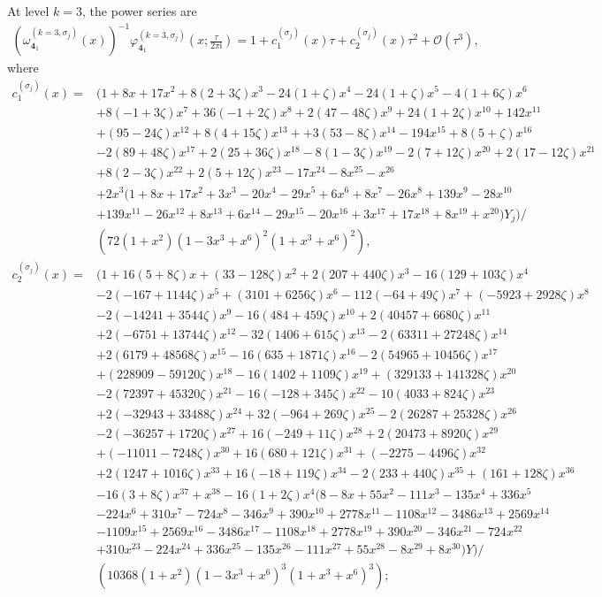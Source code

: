 \documentclass[a4paper,11pt]{article}	%
\def\md{\mathbf}
\def\cO{\mathcal{O}}
\newcommand{\ri}{{\mathsf{i}}}
\newcommand{\nn}{\nonumber \\}
\newcommand{\s}{\sigma}
\newcommand{\knot}[1]{\md{#1}}
\begin{document}
At level $k=3$, the power series are
\begin{align}
  (\omega_{\knot{4}_1}^{(k=3,\s_j)}(x))^{-1}
  \varphi_{\knot{4}_1}^{(k=3,\s_j)}(x;\frac{\tau}{2\pi\ri}) = 1 +
  c^{(\s_j)}_1(x) \tau + c^{(\s_j)}_2(x)\tau^2+ \cO(\tau^3),
\end{align}
where
\begin{align}
  c_1^{(\s_j)}(x) =
  & (1 +8 x +17 x^2 +8(2+3\zeta) x^3-24(1+\zeta) x^4
    -24(1+\zeta) x^5
    -4(1+6\zeta) x^6\nn
  &+ 8(-1+3\zeta) x^7
    + 36(-1+2\zeta) x^8
    + 2(47-48\zeta) x^9
    + 24(1+2\zeta) x^{10}
    +142 x^{11} \nn
  &+ (95-24\zeta) x^{12}
    + 8(4+15\zeta) x^{13}
    + +3(53-8\zeta) x^{14}
    - 194 x^{15}
    + 8 (5+\zeta) x^{16}\nn
  &- 2(89+48\zeta) x^{17}
    + 2(25+36\zeta) x^{18}
    -8 (1-3\zeta) x^{19}
    -2(7+12\zeta) x^{20}
    + 2(17-12\zeta) x^{21}\nn
  &+ 8(2-3\zeta) x^{22}
    + 2(5+12\zeta) x^{23}
    -17 x^{24} -8 x^{25} -
    x^{26} \nn
  &+ 2 x^3 (1 + 8 x + 17 x^2 + 3 x^3 - 20 x^4 - 29 x^5 + 6 x^6 + 8 x^7 - 
    26 x^8 + 139 x^9 - 28 x^{10} \nn
  &+ 139 x^{11} - 26 x^{12} + 8 x^{13} + 
    6 x^{14} - 29 x^{15} - 20 x^{16} + 3 x^{17} + 17 x^{18} + 8 x^{19}
    + x^{20})Y_j)/\nn
  &(72(1 + x^2) (1 - 3 x^3 + x^6)^2 (1 + x^3 + x^6)^2),\\
  c_2^{(\s_j)}(x) =
  &(1 + 16 (5 + 8 \zeta) x + (33 - 128 \zeta) x^2 + 2 (207 + 440 \zeta) x^3 - 16 (129 + 103 \zeta) x^4\nn
  &- 
    2 (-167 + 1144 \zeta) x^5 + (3101 + 6256 \zeta) x^6 - 
    112 (-64 + 49 \zeta) x^7 + (-5923 + 2928 \zeta) x^8 \nn
  &- 2 (-14241 + 3544 \zeta) x^9 - 16 (484 + 459 \zeta) x^{10} + 
    2 (40457 + 6680 \zeta) x^{11}\nn
  &+ 2 (-6751 + 13744 \zeta) x^{12} - 
    32 (1406 + 615 \zeta) x^{13} - 2 (63311 + 27248 \zeta) x^{14}\nn
  &+ 2 (6179 + 48568 \zeta) x^{15} - 16 (635 + 1871 \zeta) x^{16} - 
    2 (54965 + 10456 \zeta) x^{17}\nn
  &+ (228909 - 59120 \zeta) x^{18} - 
    16 (1402 + 1109 \zeta) x^{19} + (329133 + 141328 \zeta) x^{20}\nn
  &- 
    2 (72397 + 45320 \zeta) x^{21} - 16 (-128 + 345 \zeta) x^{22} - 
    10 (4033 + 824 \zeta) x^{23}\nn
  &+ 2 (-32943 + 33488 \zeta) x^{24} + 
    32 (-964 + 269 \zeta) x^{25} - 2 (26287 + 25328 \zeta) x^{26}\nn
  &- 
    2 (-36257 + 1720 \zeta) x^{27} + 16 (-249 + 11 \zeta) x^{28} + 
    2 (20473 + 8920 \zeta) x^{29}\nn
  &+ (-11011 - 7248 \zeta) x^{30} + 
    16 (680 + 121 \zeta) x^{31} + (-2275 - 4496 \zeta) x^{32}\nn
  &+ 
    2 (1247 + 1016 \zeta) x^{33} + 16 (-18 + 119 \zeta) x^{34} - 
    2 (233 + 440 \zeta) x^{35} + (161 + 128 \zeta) x^{36}\nn
  & - 16 (3 + 8 \zeta) x^{37} + 
    x^{38} - 
    16 (1 + 2 \zeta) x^4 (8 - 8 x + 55 x^2 - 111 x^3 - 135 x^4 + 
    336 x^5 \nn
  &- 224 x^6 + 310 x^7 - 724 x^8 - 346 x^9 + 390 x^{10} + 
    2778 x^{11} - 1108 x^{12} - 3486 x^{13} + 2569 x^{14} \nn
  &- 1109 x^{15} + 
    2569 x^{16} - 3486 x^{17} - 1108 x^{18} + 2778 x^{19} + 390 x^{20} - 
    346 x^{21} - 724 x^{22}\nn
  &+ 310 x^{23} - 224 x^{24} + 336 x^{25} - 
    135 x^{26} - 111 x^{27} + 55 x^{28} - 8 x^{29} + 8 x^{30}) Y)/\nn
  &(10368 (1 +
    x^2) (1 - 3 x^3 + x^6)^3 (1 + x^3 + x^6)^3);
\end{align}
\end{document}

